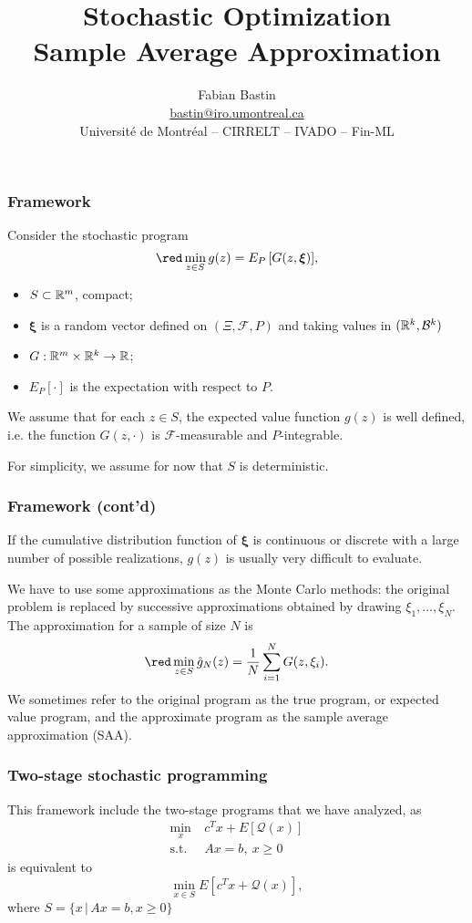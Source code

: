 \documentclass{beamer}
\title[SAA]{Stochastic Optimization\\Sample Average Approximation}
\author[Fabian Bastin]{Fabian Bastin \\ \url{bastin@iro.umontreal.ca} \\ Université de Montréal -- CIRRELT -- IVADO -- Fin-ML}
\date{}
\def\bxi{\boldsymbol\xi}
\def\cQ{\mathcal{Q}}
\begin{document}
\frame{\titlepage}

\begin{frame}
\frametitle{Framework}

Consider the stochastic program
\[
{\red \min_{z \in S} g(z) = E_P \left[ G(z, \bxi) \right]},
\]
\vspace{-0.5cm}
\begin{itemize}
\item 
$S \subset \mathbb{R}^m$, compact;
\item
$\bxi$ is a random vector defined on $( \Xi, \mathcal{F}, P )$ and taking values in $( \mathbb{R}^k, \mathcal{B}^k )$ %
\item
$G: \mathbb{R}^m \times \mathbb{R}^k \rightarrow \mathbb{R}$;
\item
$E_P[\cdot]$ is the expectation with respect to $P$.
\end{itemize}

We assume that for each $z \in S$, the expected value function $g(z)$ is well defined, i.e. the function $G(z,\cdot)$ is $\mathcal{F}$-measurable and $P$-integrable.

\mbox{}

For simplicity, we assume for now that {\blue $S$ is deterministic}.

\end{frame}

\begin{frame}
\frametitle{Framework (cont'd)}

If the cumulative distribution function of $\bxi$ is continuous or discrete with a large number of possible realizations, $g(z)$ is usually very difficult to evaluate.

\mbox{}

We have to use some approximations as the Monte Carlo methods: the original problem is replaced by successive approximations obtained by drawing $\xi_1,\ldots{}, \xi_N$.
The approximation for a sample of size $N$ is
\[
{\red \min_{z \in S} \hat{g}_N(z) = \frac{1}{N} \sum_{i = 1}^N
  G(z, \xi_i)}.
\]
We sometimes refer to the original program as the {\blue true program}, or {\blue expected value program}, and the approximate program as the {\blue sample average approximation (SAA)}.

\end{frame}

\begin{frame}
\frametitle{Two-stage stochastic programming}

This framework include the two-stage programs that we have analyzed, as
\begin{align*}
\min_x\ & c^Tx + E[\cQ(x)] \\
\mbox{s.t. } & Ax = b,\ x \geq 0
\end{align*}
is equivalent to
$$
\min_{x \in S} E[c^Tx + \cQ(x)],
$$
where $S = \{ x \,|\, Ax = b, x \geq 0 \}$

\end{frame}
\end{document}
